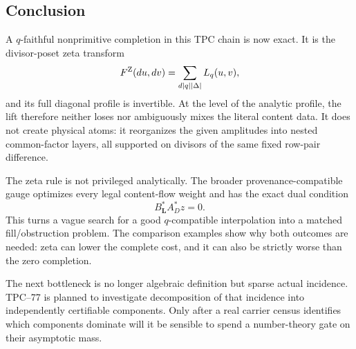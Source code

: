\subsection{Conclusion}

A \(q\)-faithful nonprimitive completion in this TPC chain is now exact.
It is the
divisor-poset zeta transform
\[
 F^{\rm Z}(du,dv)
 =
 \sum_{d\mid q\mid|\Delta|}L_q(u,v),
\]
and its full diagonal profile is invertible.  At the level of the
analytic profile, the lift therefore neither loses nor ambiguously
mixes the literal content data.  It does not create physical atoms:
it reorganizes the given amplitudes into nested common-factor layers,
all supported on divisors of the same fixed row-pair difference.

The zeta rule is not privileged analytically.  The broader
provenance-compatible gauge optimizes every legal content-flow weight and
has the exact dual condition
\[
 B_{\boldsymbol L}^*A_D^*z=0.
\]
This turns a vague search for a good \(q\)-compatible interpolation into
a matched fill/obstruction problem.  The comparison examples show why
both outcomes are needed: zeta can lower the complete cost, and it can
also be strictly worse than the zero completion.

The next bottleneck is no longer algebraic definition but sparse actual
incidence.  TPC--77 is planned to investigate decomposition of that
incidence into independently certifiable components.  Only after a real
carrier census identifies which components dominate will it be sensible
to spend a number-theory gate on their asymptotic mass.
